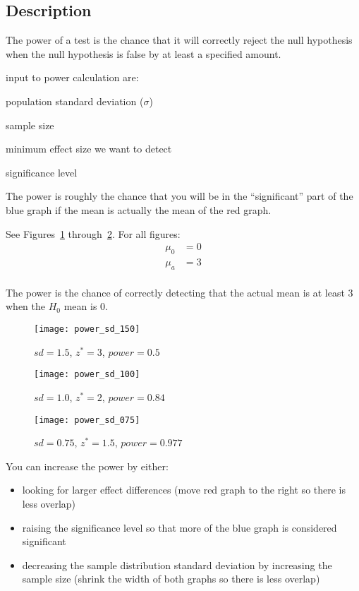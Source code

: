 \documentclass[letterpaper, landscape]{exam}
\begin{document}
  \subsection{Description} %
  
  The power of a test is the chance that it will correctly reject the null
  hypothesis when the null hypothesis is false by at least a specified amount.

  input to power calculation are:
  \begin{itemize*}
    \item population standard deviation ($\sigma$)
    \item sample size
    \item minimum effect size we want to detect
    \item significance level
  \end{itemize*}

  The power is roughly the chance that you will be in the ``significant'' part
  of the blue graph if the mean is actually the mean of the red graph.

  See Figures~\ref{fig:power1} through~\ref{fig:power3}. For all figures:
  \begin{align*}
    \mu_0 &= 0 \\
    \mu_a &= 3 \\
  \end{align*}

  The power is the chance of correctly detecting that the actual mean is at
  least 3 when the $H_0$ mean is 0.

  \begin{figure}[H]
    \centering
    \texttt{[image: power\_sd\_150]}
    \caption{$sd = 1.5$, $z^* = 3$, $power = 0.5$}\label{fig:power1}
  \end{figure}

  \begin{figure}[H]
    \centering
    \texttt{[image: power\_sd\_100]}
    \caption{$sd = 1.0$, $z^* = 2$, $power = 0.84$}
  \end{figure}
  
  \begin{figure}[H]
    \centering
    \texttt{[image: power\_sd\_075]}
    \caption{$sd = 0.75$, $z^* = 1.5$, $power = 0.977$}\label{fig:power3}
  \end{figure}

  You can increase the power by either:
  \begin{itemize}
      
    \item looking for larger effect differences (move red graph to the right so
      there is less overlap)

    \item raising the significance level so that more of the blue graph is
      considered significant

    \item decreasing the sample distribution standard deviation by increasing
      the sample size (shrink the width of both graphs so there is less overlap)

  \end{itemize}
\end{document}
